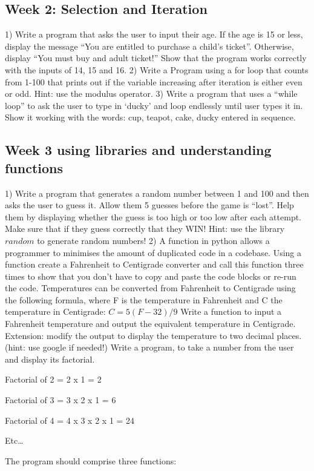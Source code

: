 \documentclass{article}
\begin{document}
	 \subsection{Week 2: Selection and Iteration}
	 1) Write a program that asks the user to input their age. If the age is 15 or less, display the message “You are entitled to purchase a child’s ticket”. Otherwise, display “You must buy and adult ticket!” Show that the program works correctly with the inputs of 14, 15 and 16.
	 2) Write a Program using a for loop that counts from 1-100 that prints out if the variable increasing after iteration is either even or odd. Hint: use the modulus operator. 
	 3) Write a program that uses a “while loop” to ask the user to type in ‘ducky’ and loop endlessly until user types it in. Show it working with the words: cup, teapot, cake, ducky entered in sequence.

	 \subsection{Week 3 using libraries and understanding functions}
	 1) Write a program that generates a random number between 1 and 100 and then asks the user to guess it. Allow them 5 guesses before the game is “lost”. Help them by displaying whether the guess is too high or too low after each attempt. Make sure that if they guess correctly that they WIN! Hint: use the library $random$ to generate random numbers! 
	 2) A function in python allows a programmer to minimises the amount of duplicated code in a codebase. Using a function create a Fahrenheit to Centigrade converter and call this function three times to show that you don't have to copy and paste the code blocks or re-run the code. Temperatures can be converted from Fahrenheit to Centigrade using the following formula, where F is the temperature in Fahrenheit and C the temperature in Centigrade: $C = 5 (F-32) / 9$ Write a function to input a Fahrenheit temperature and output the equivalent temperature in Centigrade. Extension: modify the output to display the temperature to two decimal places. (hint: use google if needed!)
	 Write a program, to take a number from the user and display its factorial. 
	 
	 Factorial of  2 = 2 x 1 = 2 
	 
	 Factorial of  3 = 3 x 2 x 1 = 6 
	 
	 Factorial of  4 = 4 x 3 x 2 x 1 = 24 
	 
	 Etc… 
	 
	 The program should comprise three functions: 
	 
\end{document}
